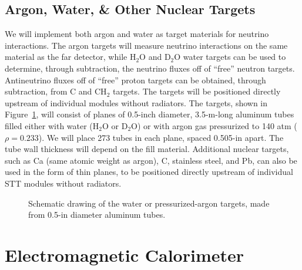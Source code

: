 \subsection{Argon, Water, \& Other Nuclear Targets}

We will implement both argon
and water as target materials for neutrino interactions.
The argon targets will measure neutrino interactions on the same material as the far detector, while
H$_2$O and D$_2$O water targets can be used to determine, through subtraction, the
neutrino fluxes off of ``free'' neutron targets. Antineutrino fluxes off of ``free''
proton targets can be obtained, through subtraction, from C and CH$_2$ targets.
The targets will be 
positioned directly upstream of individual modules without radiators. 
The targets, shown in 
Figure~\ref{STT_targets}, will consist of planes of 0.5-inch diameter, 3.5-m-long aluminum tubes filled
either with water (H$_2$O or D$_2$O) or with argon gas pressurized to 140 atm ($\rho = 0.233$). 
We will place 273 tubes in each 
plane, spaced 0.505-in apart. The tube wall thickness will depend on the fill material.
Additional nuclear targets, such as Ca (same atomic weight as argon), C, stainless
steel, and Pb, can also be used in
the form of thin planes, to be positioned directly upstream of individual STT modules without radiators.

\begin{figure}
\begin{center}
\caption[Schematic drawing of the water or pressurized-argon targets]{\label{STT_targets} Schematic drawing of the water or pressurized-argon targets, 
made from 0.5-in diameter aluminum tubes.}
\end{center}
\end{figure}

\section{Electromagnetic Calorimeter}

